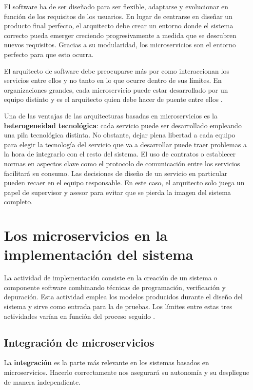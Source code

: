 \documentclass[11pt,spanish,listoffigures]{tfgetsinf}
\begin{document}
El software ha de ser diseñado para ser flexible, adaptarse y evolucionar en función de los requisitos de los usuarios. En lugar de centrarse en diseñar un producto final perfecto, el arquitecto debe crear un entorno donde el sistema correcto pueda emerger creciendo progresivamente a medida que se descubren nuevos requisitos. Gracias a su modularidad, los microservicios son el entorno perfecto para que esto ocurra.

El arquitecto de software debe preocuparse más por como interaccionan los servicios entre ellos y no tanto en lo que ocurre dentro de sus límites. En organizaciones grandes, cada microservicio puede estar desarrollado por un equipo distinto y es el arquitecto quien debe hacer de puente entre ellos \cite{Newman2015a}.

Una de las ventajas de las arquitecturas basadas en microservicios es la \textbf{heterogeneidad tecnol\'ogica}: cada servicio puede ser desarrollado empleando una pila tecnológica distinta. No obstante, dejar plena libertad a cada equipo para elegir la tecnología del servicio que va a desarrollar puede traer problemas a la hora de integrarlo con el resto del sistema. El uso de contratos o establecer normas en aspectos clave como el protocolo de comunicación entre los servicios facilitará su consumo. Las decisiones de diseño de un servicio en particular pueden recaer en el equipo responsable. En este caso, el arquitecto solo juega un papel de supervisor y asesor para evitar que se pierda la imagen del sistema completo.

\section{Los microservicios en la implementaci\'on del sistema}

La actividad de implementación consiste en la creación de un sistema o componente software combinando técnicas de programación, verificación y depuración. Esta actividad emplea los modelos producidos durante el diseño del sistema y sirve como entrada para la de pruebas. Los límites entre estas tres actividades varían en función del proceso seguido \cite{Bourque2014}.

\subsection{Integración de microservicios} \label{subsect:Integracion}

La \textbf{integración} es la parte más relevante en los sistemas basados en microservicios. Hacerlo correctamente nos asegurará su autonomía y su despliegue de manera independiente.
\end{document}

